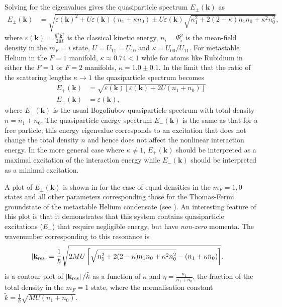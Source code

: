 Solving for the eigenvalues gives the quasiparticle spectrum $E_\pm(\mathbf{k})$ as
\begin{align}
    E_\pm(\mathbf{k}) &= \sqrt{\varepsilon(\mathbf{k})^2 + U \varepsilon(\mathbf{k}) (n_1 + \kappa n_0) \pm U \varepsilon(\mathbf{k})\sqrt{n_1^2 + 2 (2 - \kappa) n_1 n_0 + \kappa^2 n_0^2} },
    \label{Peaks:QuasiparticleSpectrum}
\end{align}
where $\displaystyle\varepsilon(\mathbf{k}) = \frac{\hbar^2 \mathbf{k}^2}{2M}$ is the classical kinetic energy, $n_i=\Psi_i^2$ is the mean-field density in the $m_F=i$ state, $U = U_{11} = U_{10}$ and $\kappa = U_{00}/U_{11}$. For metastable Helium in the $F=1$ manifold, $\kappa \approx 0.74 < 1$ while for atoms like Rubidium in either the $F=1$ or $F=2$ manifolds, $\kappa = 1.0 \pm 0.1$.  In the limit that the ratio of the scattering lengths $\kappa \rightarrow 1$ the quasiparticle spectrum becomes
\begin{align}
    E_+(\mathbf{k}) &= \sqrt{\varepsilon(\mathbf{k})\left[\varepsilon(\mathbf{k}) + 2 U (n_1 + n_0) \right]} \label{Peaks:EPlusSimple}\\
    E_-(\mathbf{k}) &= \varepsilon(\mathbf{k}), \label{Peaks:EMinusSimple}
\end{align}
where $E_+(\mathbf{k})$ is the usual Bogoliubov quasiparticle spectrum \citep{Bogoliubov:1947} with total density $n = n_1 + n_0$. The quasiparticle energy spectrum $E_-(\mathbf{k})$ is the same as that for a free particle; this energy eigenvalue corresponds to an excitation that does not change the total density $n$ and hence does not affect the nonlinear interaction energy. In the more general case where $\kappa \neq 1$, $E_+(\mathbf{k})$ should be interpreted as a maximal excitation of the interaction energy while $E_-(\mathbf{k})$ should be interpreted as a minimal excitation.

A plot of $E_\pm(\mathbf{k})$ is shown in  for the case of equal densities in the $m_F=1, 0$ states and all other parameters corresponding those for the Thomas-Fermi groundstate of the metastable Helium condensate (see ). An interesting feature of this plot is that it demonstrates that this system contains quasiparticle excitations ($E_-$) that require negligible energy, but have \emph{non-zero} momenta. The wavenumber corresponding to this resonance is
\begin{align}
    \abs{\mathbf{k}_\text{res}} &= \frac{1}{\hbar} \sqrt{2 M U \left[\sqrt{n_1^2 + 2(2 - \kappa)n_1 n_0 + \kappa^2 n_0^2} - (n_1 + \kappa n_0)\right]}. \label{Peaks:BogResonantWavenumber}
\end{align}
 is a contour plot of $\left|\mathbf{k}_\text{res}\right|/\tilde{k}$ as a function of $\kappa$ and $\displaystyle\eta = \frac{n_1}{n_1 + n_0}$, the fraction of the total density in the $m_F=1$ state, where the normalisation constant $\displaystyle\tilde{k}=  \frac{1}{\hbar}\sqrt{MU(n_1 + n_0)}$.

